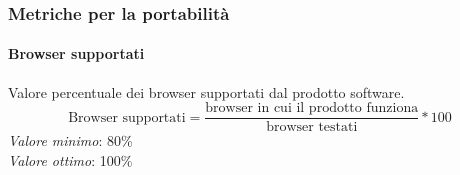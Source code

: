 \subsubsection{Metriche per la portabilità}
\paragraph{Browser supportati}
Valore percentuale dei browser supportati dal prodotto software.\\
\begin{equation*}
\text{Browser supportati}=\frac{\text{browser in cui il prodotto funziona}}{\text{browser testati}}*100
\end{equation*}	
\textit{Valore minimo}: 80\%\\
\textit{Valore ottimo}: 100\%\\